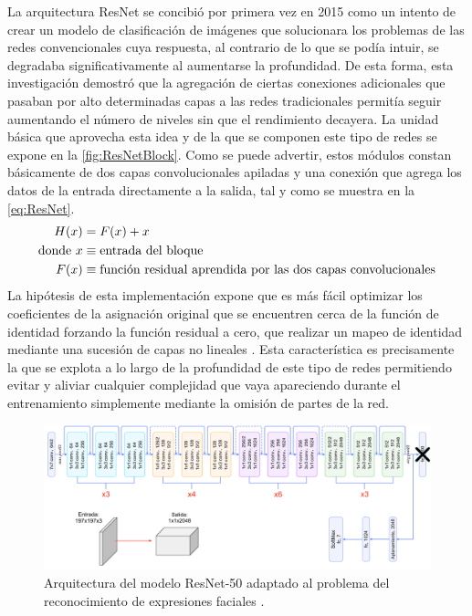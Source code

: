 La arquitectura ResNet se concibió por primera vez en 2015 \cite{ResNet} como un intento de crear un modelo de clasificación de imágenes que solucionara los problemas de las redes convencionales cuya respuesta, al contrario de lo que se podía intuir, se degradaba significativamente al aumentarse la profundidad. De esta forma, esta investigación demostró que la agregación de ciertas conexiones adicionales que pasaban por alto determinadas capas a las redes tradicionales permitía seguir aumentando el número de niveles sin que el rendimiento decayera. La unidad básica que aprovecha esta idea y de la que se componen este tipo de redes se expone en la \autoref{fig:ResNetBlock}. Como se puede advertir, estos módulos constan básicamente de dos capas convolucionales apiladas y una conexión que agrega los datos de la entrada directamente a la salida, tal y como se muestra en la \autoref{eq:ResNet}.
\begin{align} \label{eq:ResNet}
    H(x) &= F(x) + x \\
    \text{donde}~ 
    x &\equiv \text{entrada del bloque} \notag \\
    F(x) & \equiv \text{función residual aprendida por las dos capas convolucionales} \notag
\end{align}
La hipótesis de esta implementación expone que es más fácil optimizar los coeficientes de la asignación original que se encuentren cerca de la función de identidad forzando la función residual a cero, que realizar un mapeo de identidad mediante una sucesión de capas no lineales \cite{ResNet}. Esta característica es precisamente la que se explota a lo largo de la profundidad de este tipo de redes permitiendo evitar y aliviar cualquier complejidad que vaya apareciendo durante el entrenamiento simplemente mediante la omisión de partes de la red.

\begin{figure}
    \centering
    \includegraphics[width=\textwidth]{Images/ResNet-50.png}
    \caption{Arquitectura del modelo ResNet-50 adaptado al problema del reconocimiento de expresiones faciales \cite{img:ResNet-50}.}
    \label{fig:ResNet-50}
\end{figure}

